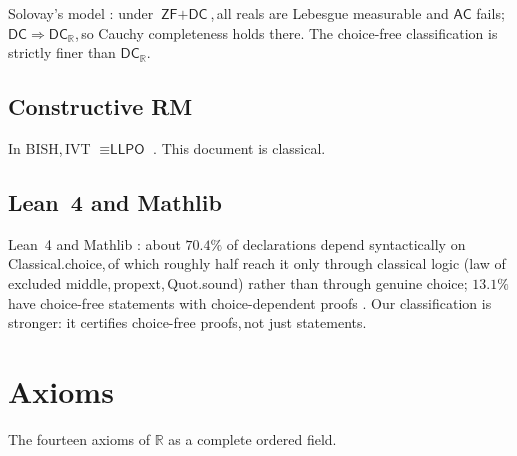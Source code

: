 \documentclass[11pt,reqno]{amsart}
\providecommand{\R}{\mathbb{R}}
\newcommand{\comma}{,\,\allowbreak}
\theoremstyle{redplain}
\begin{document}
Solovay's model \cite{Solovay1970}: under $\textsf{ZF}+\textsf{DC}$\comma all reals are Lebesgue measurable and $\textsf{AC}$ fails; $\textsf{DC}\Rightarrow\textsf{DC}_\R$\comma so Cauchy completeness holds there. The choice-free classification is strictly finer than $\textsf{DC}_\R$.

\subsection{Constructive RM}

In BISH\comma IVT $\equiv\textsf{LLPO}$ \cite{Bridges2023}. This document is classical.

\subsection{Lean~4 and Mathlib}

Lean~4 and Mathlib \cite{Lean4}: about $70.4\%$ of declarations depend syntactically on \textsf{Classical.choice}\comma of which roughly half reach it only through classical logic (law of excluded middle\comma \textsf{propext}\comma \textsf{Quot.sound}) rather than through genuine choice; $13.1\%$ have choice-free statements with choice-dependent proofs \cite{Crossref2026}. Our classification is stronger: it certifies choice-free proofs\comma not just statements.

\section{Axioms}
\label{sec:axioms}

\noindent The fourteen axioms of $\R$ as a complete ordered field.

\medskip
\end{document}
